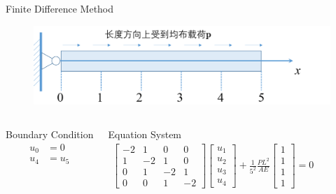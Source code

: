 \documentclass[11pt]{beamer}
\begin{document}
\begin{frame}{Finite Difference Method}	
\begin{figure}
\centering
\includegraphics[width=0.7\linewidth]{source/differential_1}
\end{figure}

\begin{columns}
\begin{block}{Boundary Condition}
\begin{align*}
u_0&=0\\
u_4&=u_5
\end{align*}
\end{block}
\begin{block}{Equation System}
\begin{align*}
\left[ \begin{matrix}
-2&  1& 0 & 0 \\ 
1&  -2&1  &0  \\ 
0& 1 &  -2&1  \\ 
0& 0 & 1 & -2
\end{matrix}\right]
\left[
\begin{matrix}
u_1 \\ u_2\\u_3\\u_4
\end{matrix}  
\right] 
+
\frac{1}{5^2}\frac{PL^2}{AE}
\left[
\begin{matrix}
1 \\ 1\\1\\1
\end{matrix}  
\right] =0
\end{align*}
\end{block}
\end{columns}
\end{frame}
\end{document}
